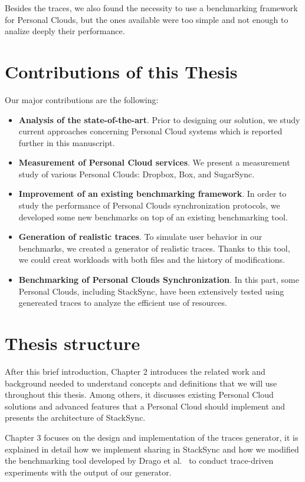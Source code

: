 Besides the traces, we also found the necessity to use a benchmarking framework for Personal Clouds, but the
ones available were too simple and not enough to analize deeply their performance.

\section{Contributions of this Thesis}
Our major contributions are the following:

\begin{itemize}
	\item \textbf{Analysis of the state-of-the-art}. Prior to designing our solution, we study current approaches concerning Personal Cloud systems which is reported further in this manuscript.
	\item \textbf{Measurement of Personal Cloud services}. We present a measurement study of various Personal Clouds: Dropbox, Box, and SugarSync.
	\item \textbf{Improvement of an existing benchmarking framework}. In order to study the performance of Personal
	Clouds synchronization protocols, we developed some new benchmarks on top of an existing benchmarking tool.
	\item \textbf{Generation of realistic traces}. To simulate user behavior in our benchmarks, we created a
	generator of realistic traces. Thanks to this tool, we could creat workloads with both files and the history of modifications.
	\item \textbf{Benchmarking of Personal Clouds Synchronization}. In this part, some Personal Clouds, including StackSync, have
	been extensively tested using genereated traces to analyze the efficient use of resources.	
\end{itemize}

\section{Thesis structure}
After this brief introduction, Chapter 2 introduces the related work and background needed to understand concepts
and definitions that we will use throughout this thesis. Among others, it discusses existing Personal Cloud solutions and advanced features that a Personal Cloud should implement and presents the architecture of StackSync.

Chapter 3 focuses on the design and implementation of the traces generator, it is explained in detail how we implement sharing in StackSync and how we modified the benchmarking tool developed by Drago et al.~\cite{drago2013benchmarking} to
conduct trace-driven experiments with the output of our generator.

